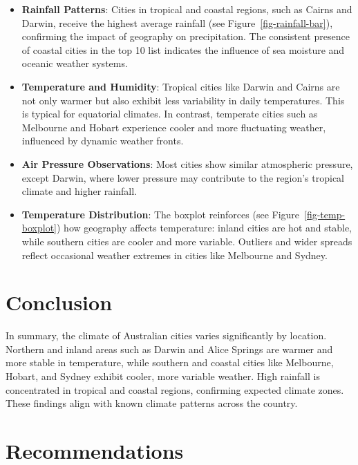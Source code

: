 \documentclass[
  letterpaper,
  DIV=11,
  numbers=noendperiod]{scrartcl}
\begin{document}
\begin{itemize}
\item
  \textbf{Rainfall Patterns}: Cities in tropical and coastal regions,
  such as Cairns and Darwin, receive the highest average rainfall (see
  Figure~\ref{fig-rainfall-bar}), confirming the impact of geography on
  precipitation. The consistent presence of coastal cities in the top 10
  list indicates the influence of sea moisture and oceanic weather
  systems.
\item
  \textbf{Temperature and Humidity}: Tropical cities like Darwin and
  Cairns are not only warmer but also exhibit less variability in daily
  temperatures. This is typical for equatorial climates. In contrast,
  temperate cities such as Melbourne and Hobart experience cooler and
  more fluctuating weather, influenced by dynamic weather fronts.
\item
  \textbf{Air Pressure Observations}: Most cities show similar
  atmospheric pressure, except Darwin, where lower pressure may
  contribute to the region's tropical climate and higher rainfall.
\item
  \textbf{Temperature Distribution}: The boxplot reinforces (see
  Figure~\ref{fig-temp-boxplot}) how geography affects temperature:
  inland cities are hot and stable, while southern cities are cooler and
  more variable. Outliers and wider spreads reflect occasional weather
  extremes in cities like Melbourne and Sydney.
\end{itemize}

\section{Conclusion}\label{conclusion}

In summary, the climate of Australian cities varies significantly by
location. Northern and inland areas such as Darwin and Alice Springs are
warmer and more stable in temperature, while southern and coastal cities
like Melbourne, Hobart, and Sydney exhibit cooler, more variable
weather. High rainfall is concentrated in tropical and coastal regions,
confirming expected climate zones. These findings align with known
climate patterns across the country.

\section{Recommendations}\label{recommendations}
\end{document}
